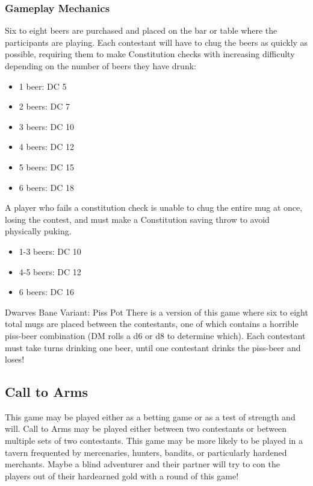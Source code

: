 \documentclass[10pt,a4paper,twoside,twocolumn,openany,nodeprecatedcode]{dndarticle}
\begin{document}
\subsubsection{Gameplay Mechanics}
Six to eight beers are purchased and placed on the bar or table where the participants are playing. Each contestant will have to chug the beers as quickly as possible, requiring them to make Constitution checks with increasing difficulty depending on the number of beers they have drunk:
\begin{itemize}

\item 1 beer: DC 5
\item 2 beers: DC 7
\item 3 beers: DC 10
\item 4 beers: DC 12
\item 5 beers: DC 15
\item 6 beers: DC 18
\end{itemize}


A player who fails a constitution check is unable to chug the entire mug at once, losing the contest, and must make a Constitution saving throw to avoid physically puking.
\begin{itemize}

\item 1-3 beers: DC 10
\item 4-5 beers: DC 12
\item 6 beers: DC 16
\end{itemize}


\begin{DndComment}{Dwarves Bane Variant: Piss Pot}
There is a version of this game where six to eight total mugs are placed between the contestants, one of which contains a horrible piss-beer combination (DM rolls a d6 or d8 to determine which). Each contestant must take turns drinking one beer, until one contestant drinks the piss-beer and loses!
\end{DndComment}

\subsection{Call to Arms}
This game may be played either as a betting game or as a test of strength and will. Call to Arms may be played either between two contestants or between multiple sets of two contestants. This game may be more likely to be played in a tavern frequented by mercenaries, hunters, bandits, or particularly hardened merchants. Maybe a blind adventurer and their partner will try to con the players out of their hardearned gold with a round of this game!
\end{document}
